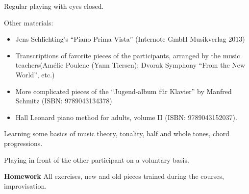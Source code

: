 Regular playing with eyes closed.

Other materials:
\begin{itemize}
\item Jens Schlichting’s “Piano Prima Vista” (Internote GmbH Musikverlag 2013)
\item Transcriptions of favorite pieces of the participants, arranged by the music teachers(Amélie Poulenc (Yann Tiersen); Dvorak Symphony “From the New World”, etc.)
\item More complicated pieces of the “Jugend-album für Klavier” by Manfred Schmitz (ISBN: 9789043134378)
\item Hall Leonard piano method for adults, volume II (ISBN: 9789043152037).
\end{itemize}

Learning some basics of music theory, tonality, half and whole tones, chord progressions.

Playing in front of the other participant on a voluntary basis.

\textbf{Homework}
All exercises, new and old pieces trained during the courses, improvisation.

